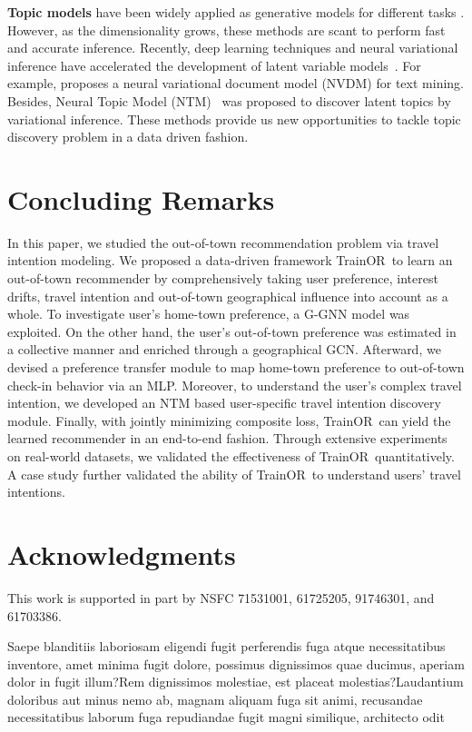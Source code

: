 \documentclass[letterpaper]{article} %
\newcommand{\ourmodel}{{\sc TrainOR}}
\begin{document}
{\bf{Topic models}}
have been widely applied as generative models for different tasks \cite{wang2017location,xu2017measuring,shen2018joint,zhou2019topic,luo2020spatial}.
However, as the dimensionality grows, these methods are scant to perform fast and accurate inference. %
Recently, deep learning techniques and neural variational inference have accelerated the development of latent variable models~\cite{miao2016neural,miao2017discovering,kingma2013auto,srivastava2017autoencoding}.
For example, \cite{miao2016neural} proposes a neural variational document model (NVDM) for text mining.
Besides, Neural Topic Model (NTM)~\cite{miao2017discovering} was proposed to discover latent topics by variational inference.
These methods provide us new opportunities to tackle topic discovery problem in a data driven fashion.


\section{Concluding Remarks}

In this paper, we studied the out-of-town recommendation problem via travel intention modeling.
We proposed a data-driven framework \ourmodel~to learn an out-of-town recommender by comprehensively taking user preference, interest drifts, travel intention and out-of-town geographical influence into account as a whole.
To investigate user's home-town preference, a G-GNN model was exploited.
On the other hand, the user's out-of-town preference was estimated in a collective manner and enriched through a geographical GCN.
Afterward, we devised a preference transfer module to map home-town preference to out-of-town check-in behavior via an MLP.
Moreover, to understand the user's complex travel intention, we developed an NTM based user-specific travel intention discovery module.
Finally, with jointly minimizing composite loss, \ourmodel~can yield the learned recommender in an end-to-end fashion.
Through extensive experiments on real-world datasets, we validated the effectiveness of \ourmodel~quantitatively.
A case study further validated the ability of \ourmodel~to understand users' travel intentions.


\section*{Acknowledgments}

This work is supported in part by NSFC {71531001, 61725205, 91746301, and 61703386}.


Saepe blanditiis laboriosam eligendi fugit perferendis fuga atque necessitatibus inventore, amet minima fugit dolore, possimus dignissimos quae ducimus, aperiam dolor in fugit illum?Rem dignissimos molestiae, est placeat molestias?Laudantium doloribus aut minus nemo ab, magnam aliquam fuga sit animi, recusandae necessitatibus laborum fuga repudiandae fugit magni similique, architecto odit

\end{document}
